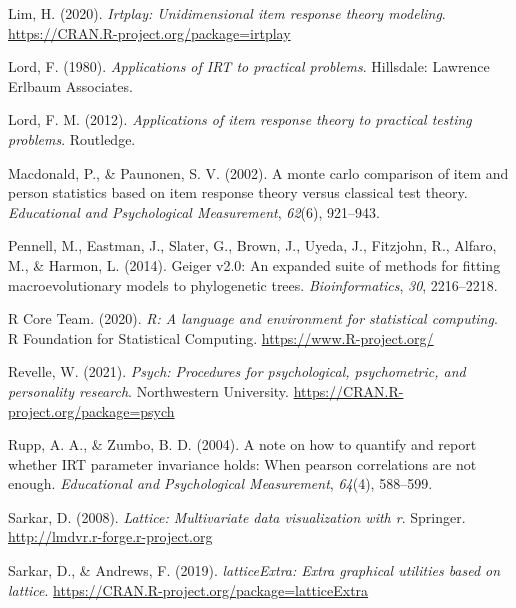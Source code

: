 \documentclass[
  man]{apa6}
\newlength{\cslhangindent}
\newlength{\cslentryspacingunit} %
\newenvironment{CSLReferences}[2] %
 {%
  \setlength{\parindent}{0pt}
  \ifodd #1
  \let\oldpar\par
  \def\par{\hangindent=\cslhangindent\oldpar}
  \fi
  \setlength{\parskip}{#2\cslentryspacingunit}
 }%
 {}
\begin{document}
\begin{CSLReferences}{1}{0}
\leavevmode{}%
Lim, H. (2020). \emph{Irtplay: Unidimensional item response theory modeling}. \url{https://CRAN.R-project.org/package=irtplay}

\leavevmode{}%
Lord, F. (1980). \emph{Applications of IRT to practical problems}. Hillsdale: Lawrence Erlbaum Associates.

\leavevmode{}%
Lord, F. M. (2012). \emph{Applications of item response theory to practical testing problems}. Routledge.

\leavevmode{}%
Macdonald, P., \& Paunonen, S. V. (2002). A monte carlo comparison of item and person statistics based on item response theory versus classical test theory. \emph{Educational and Psychological Measurement}, \emph{62}(6), 921--943.

\leavevmode{}%
Pennell, M., Eastman, J., Slater, G., Brown, J., Uyeda, J., Fitzjohn, R., Alfaro, M., \& Harmon, L. (2014). Geiger v2.0: An expanded suite of methods for fitting macroevolutionary models to phylogenetic trees. \emph{Bioinformatics}, \emph{30}, 2216--2218.

\leavevmode{}%
R Core Team. (2020). \emph{R: A language and environment for statistical computing}. R Foundation for Statistical Computing. \url{https://www.R-project.org/}

\leavevmode{}%
Revelle, W. (2021). \emph{Psych: Procedures for psychological, psychometric, and personality research}. Northwestern University. \url{https://CRAN.R-project.org/package=psych}

\leavevmode{}%
Rupp, A. A., \& Zumbo, B. D. (2004). A note on how to quantify and report whether IRT parameter invariance holds: When pearson correlations are not enough. \emph{Educational and Psychological Measurement}, \emph{64}(4), 588--599.

\leavevmode{}%
Sarkar, D. (2008). \emph{Lattice: Multivariate data visualization with r}. Springer. \url{http://lmdvr.r-forge.r-project.org}

\leavevmode{}%
Sarkar, D., \& Andrews, F. (2019). \emph{latticeExtra: Extra graphical utilities based on lattice}. \url{https://CRAN.R-project.org/package=latticeExtra}


\end{CSLReferences}
\end{document}
